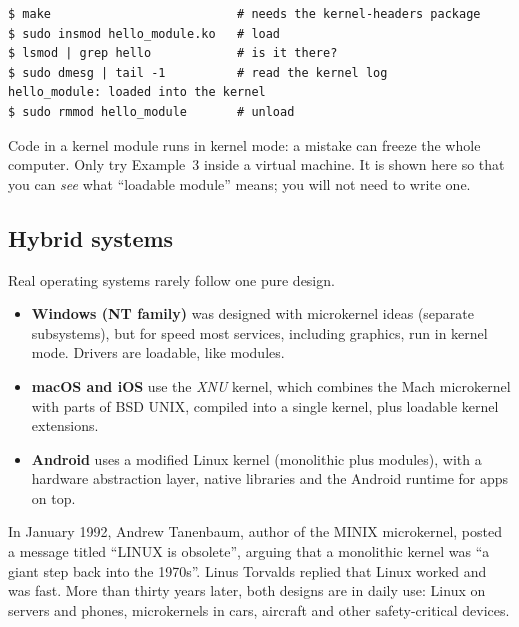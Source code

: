 \documentclass[11pt,a4paper]{article}
\begin{document}


\begin{lstlisting}[style=term]
$ make                          # needs the kernel-headers package
$ sudo insmod hello_module.ko   # load
$ lsmod | grep hello            # is it there?
$ sudo dmesg | tail -1          # read the kernel log
hello_module: loaded into the kernel
$ sudo rmmod hello_module       # unload
\end{lstlisting}

\begin{tryit}
Code in a kernel module runs in kernel mode: a mistake can freeze the whole computer. Only try Example~3 inside a virtual machine. It is shown here so that you can \emph{see} what ``loadable module'' means; you will not need to write one.
\end{tryit}

\subsection{Hybrid systems}

Real operating systems rarely follow one pure design.

\begin{itemize}
  \item \textbf{Windows (NT family)} was designed with microkernel ideas (separate subsystems), but for speed most services, including graphics, run in kernel mode. Drivers are loadable, like modules.
  \item \textbf{macOS and iOS} use the \emph{XNU} kernel, which combines the Mach microkernel with parts of BSD UNIX, compiled into a single kernel, plus loadable kernel extensions.
  \item \textbf{Android} uses a modified Linux kernel (monolithic plus modules), with a hardware abstraction layer, native libraries and the Android runtime for apps on top.
\end{itemize}

\begin{histnote}
In January 1992, Andrew Tanenbaum, author of the MINIX microkernel, posted a message titled ``LINUX is obsolete'', arguing that a monolithic kernel was ``a giant step back into the 1970s''. Linus Torvalds replied that Linux worked and was fast. More than thirty years later, both designs are in daily use: Linux on servers and phones, microkernels in cars, aircraft and other safety-critical devices.
\end{histnote}
\end{document}

